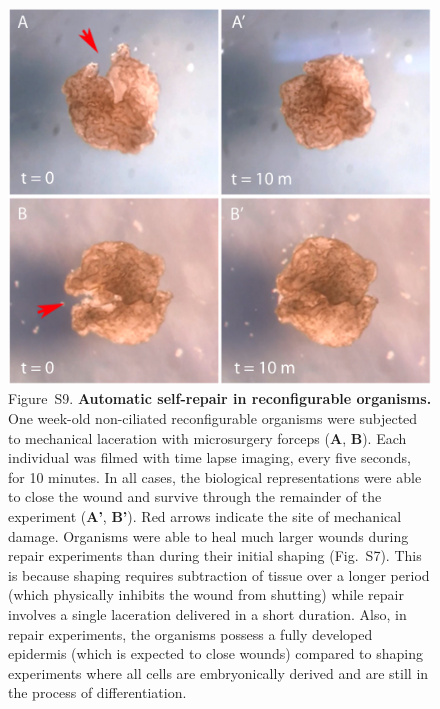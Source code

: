 \begin{figure}[t]
\centering
\includegraphics[width=0.9\linewidth]{Chapter07/img/Fig5.png}
\caption*{Figure~S9.  \textbf{Automatic self-repair in reconfigurable organisms.} 
One week-old non-ciliated reconfigurable organisms were subjected to mechanical laceration with microsurgery forceps (\textbf{A}, \textbf{B}). 
Each individual was filmed with time lapse imaging, every five seconds, for 10 minutes. 
In all cases, the biological representations were able to close the wound and survive through the remainder of the experiment (\textbf{A'}, \textbf{B'}). 
Red arrows indicate the site of mechanical damage. 
Organisms were able to heal much larger wounds during repair experiments than during their initial shaping (Fig.~S7). 
This is because shaping requires subtraction of tissue over a longer period (which physically inhibits the wound from shutting) while repair involves a single laceration delivered in a short duration. 
Also, in repair experiments, the organisms possess a fully developed epidermis (which is expected to close wounds) compared to shaping experiments where all cells are embryonically derived and are still in the process of differentiation.
}
\end{figure}


